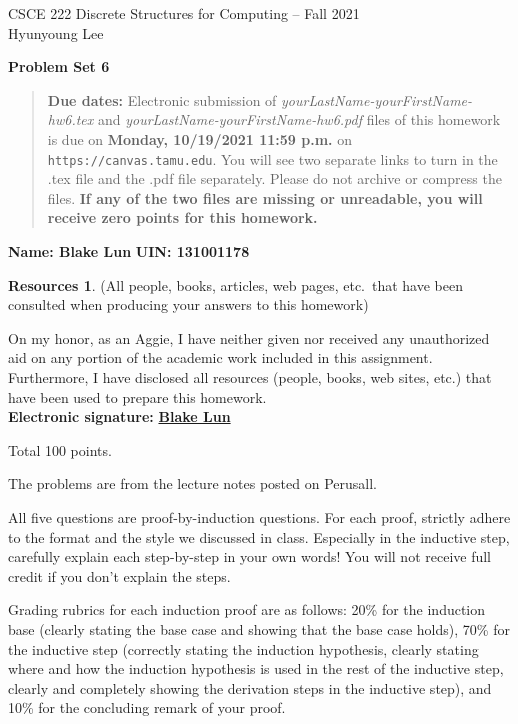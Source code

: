 \documentclass{article}
\theoremstyle{definition}
\newtheorem*{resources}{Resources}
\newcommand{\name}[2]{\noindent\textbf{Name: #1}\hfill \textbf{UIN: #2}}
\newcommand{\honor}{\noindent On my honor, as an Aggie, I have neither
  given nor received any unauthorized aid on any portion of the
  academic work included in this assignment. Furthermore, I have
  disclosed all resources (people, books, web sites, etc.) that have
  been used to prepare this homework. \\[2ex]
 \textbf{Electronic signature:} \underline{ \textbf{Blake Lun} } }
\newcommand{\problemset}[1]{\begin{center}\textbf{Problem Set #1}\end{center}}
\newcommand{\duedate}[1]{\begin{quote}\textbf{Due dates:} Electronic
    submission of \textsl{yourLastName-yourFirstName-hw6.tex} and 
    \textsl{yourLastName-yourFirstName-hw6.pdf} files of this homework is due on
    \textbf{#1} on \texttt{https://canvas.tamu.edu}. You will see two separate links
    to turn in the .tex file and the .pdf file separately. Please do not archive or compress the files.  
    \textbf{If any of the two files are missing or unreadable, you will receive zero points for this
    homework.}\end{quote} }
\begin{document}
\vspace*{-20mm}
\begin{center}
{\large
CSCE 222 Discrete Structures for Computing -- Fall 2021\\[.5ex]
Hyunyoung Lee\\}
\end{center}
\problemset{6}
\duedate{Monday, 10/19/2021 11:59 p.m.}
\name{ Blake Lun }{ 131001178 }
\begin{resources} (All people, books, articles, web pages, etc.\ that
  have been consulted when producing your answers to this homework)
\end{resources}
\honor

\bigskip

\noindent
Total 100 points.

\bigskip

\noindent
The problems are from the lecture notes posted on Perusall.

\medskip

\noindent
All five questions are proof-by-induction questions.  For each proof, strictly adhere 
to the format and the style we discussed in class.  Especially in the inductive step, 
carefully explain each step-by-step in your own words!  You will not receive full credit 
if you don't explain the steps.

Grading rubrics for each induction proof are as follows: 20\% for the induction base
(clearly stating the base case and showing that the base case holds), 70\% for the
inductive step (correctly stating the induction hypothesis, clearly stating where
and how the induction hypothesis is used in the rest of the inductive step, clearly
and completely showing the derivation steps in the inductive step), and 10\% for the 
concluding remark of your proof. 

\medskip
\end{document}
